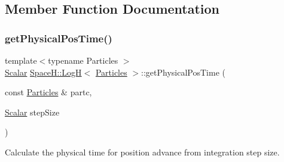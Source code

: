 \subsection{Member Function Documentation}
\mbox{\label{class_space_h_1_1_log_h_a57e53ea3152d08ebb3153bd42a71e3a8}} 
\subsubsection{\texorpdfstring{get\+Physical\+Pos\+Time()}{getPhysicalPosTime()}}
{\footnotesize\ttfamily template$<$typename Particles $>$ \\
\mbox{\hyperlink{class_space_h_1_1_log_h_a930675187172d40c888b4b2c94f0bff5}{Scalar}} \mbox{\hyperlink{class_space_h_1_1_log_h}{Space\+H\+::\+LogH}}$<$ \mbox{\hyperlink{struct_space_h_1_1_particles}{Particles}} $>$\+::get\+Physical\+Pos\+Time (\begin{DoxyParamCaption}\item[{const \mbox{\hyperlink{struct_space_h_1_1_particles}{Particles}} \&}]{partc,  }\item[{\mbox{\hyperlink{class_space_h_1_1_log_h_a930675187172d40c888b4b2c94f0bff5}{Scalar}}}]{step\+Size }\end{DoxyParamCaption})\hspace{0.3cm}{\ttfamily [inline]}}



Calculate the physical time for position advance from integration step size. 


